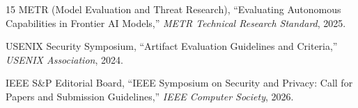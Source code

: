 \documentclass[conference]{IEEEtran}
\begin{document}
\begin{thebibliography}{15}
METR (Model Evaluation and Threat Research), ``Evaluating Autonomous Capabilities in Frontier AI Models,'' \emph{METR Technical Research Standard}, 2025.

USENIX Security Symposium, ``Artifact Evaluation Guidelines and Criteria,'' \emph{USENIX Association}, 2024.

IEEE S\&P Editorial Board, ``IEEE Symposium on Security and Privacy: Call for Papers and Submission Guidelines,'' \emph{IEEE Computer Society}, 2026.
\end{thebibliography}
\end{document}
